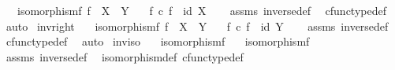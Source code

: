 \begin{isabellebody}
\ \ \ {\isachardoublequoteopen}isomorphism{\isacharparenleft}{\kern0pt}f{\isacharparenright}{\kern0pt}{\isachardoublequoteclose}\ {\isachardoublequoteopen}f\ {\isacharcolon}{\kern0pt}\ X\ {\isasymrightarrow}\ Y{\isachardoublequoteclose}\isanewline
\ \ \ {\isachardoublequoteopen}f\isactrlbold {\isasyminverse}\ {\isasymcirc}\isactrlsub c\ f\ {\isacharequal}{\kern0pt}\ id\ X{\isachardoublequoteclose}\isanewline
%
\isadelimproof
\ \ %
\endisadelimproof
%
\isatagproof
{}\isamarkupfalse%
\ assms\ inverse{\isacharunderscore}{\kern0pt}def{}\ \isamarkupfalse%
\ cfunc{\isacharunderscore}{\kern0pt}type{\isacharunderscore}{\kern0pt}def\ \isamarkupfalse%
\ auto%
\endisatagproof
{\isafoldproof}%
%
\isadelimproof
\isanewline
%
\endisadelimproof
\isanewline
{}\isamarkupfalse%
\ inv{\isacharunderscore}{\kern0pt}right{\isacharcolon}{\kern0pt}\isanewline
\ \ \ {\isachardoublequoteopen}isomorphism{\isacharparenleft}{\kern0pt}f{\isacharparenright}{\kern0pt}{\isachardoublequoteclose}\ {\isachardoublequoteopen}f\ {\isacharcolon}{\kern0pt}\ X\ {\isasymrightarrow}\ Y{\isachardoublequoteclose}\isanewline
\ \ \ {\isachardoublequoteopen}f\ {\isasymcirc}\isactrlsub c\ f\isactrlbold {\isasyminverse}\ {\isacharequal}{\kern0pt}\ id\ Y{\isachardoublequoteclose}\isanewline
%
\isadelimproof
\ \ %
\endisadelimproof
%
\isatagproof
{}\isamarkupfalse%
\ assms\ inverse{\isacharunderscore}{\kern0pt}def{}\ \isamarkupfalse%
\ cfunc{\isacharunderscore}{\kern0pt}type{\isacharunderscore}{\kern0pt}def\ \isamarkupfalse%
\ auto%
\endisatagproof
{\isafoldproof}%
%
\isadelimproof
\isanewline
%
\endisadelimproof
\isanewline
{}\isamarkupfalse%
\ inv{\isacharunderscore}{\kern0pt}iso{\isacharcolon}{\kern0pt}\isanewline
\ \ \ {\isachardoublequoteopen}isomorphism{\isacharparenleft}{\kern0pt}f{\isacharparenright}{\kern0pt}{\isachardoublequoteclose}\isanewline
\ \ \ {\isachardoublequoteopen}isomorphism{\isacharparenleft}{\kern0pt}f\isactrlbold {\isasyminverse}{\isacharparenright}{\kern0pt}{\isachardoublequoteclose}\isanewline
%
\isadelimproof
\ \ %
\endisadelimproof
%
\isatagproof
{}\isamarkupfalse%
\ assms\ inverse{\isacharunderscore}{\kern0pt}def{}\ \isamarkupfalse%
\ isomorphism{\isacharunderscore}{\kern0pt}def\ cfunc{\isacharunderscore}{\kern0pt}type{\isacharunderscore}{\kern0pt}def\ \isamarkupfalse%

\end{isabellebody}
